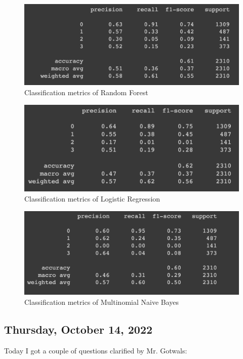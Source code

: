 \documentclass[11pt,letterpaper]{article}
\begin{document}
\begin{figure}
    \centering
    \includegraphics[scale=0.6]{images/simp_forest.png}
    \caption{Classification metrics of Random Forest}
    \label{fig:simp_forest}
\end{figure}

\begin{figure}
    \centering
    \includegraphics[scale=0.6]{images/simp_logistic.png}
    \caption{Classification metrics of Logistic Regression}
    \label{fig:simp_logistic}
\end{figure}

\begin{figure}
    \centering
    \includegraphics[scale=0.6]{images/simp_multi.png}
    \caption{Classification metrics of Multinomial Naive Bayes}
    \label{fig:simp_multi}
\end{figure}

\subsection{Thursday, October 14, 2022}
Today I got a couple of questions clarified by Mr. Gotwals:
\end{document}
